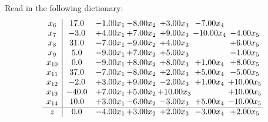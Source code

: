 \documentclass[9pt]{article}
\begin{document}
Read in the following dictionary:
\[\begin{array}{c| c c@{\hskip 2pt} c@{\hskip 2pt} c@{\hskip 2pt} c@{\hskip 2pt} c@{\hskip 2pt} }
 x_{6}   &  17.0 & -1.00 x_{1} & -8.00 x_{2} & +  3.00 x_{3} & -7.00 x_{4} &   \\
 x_{7}   &  -3.0 & +  4.00 x_{1} & +  7.00 x_{2} & +  9.00 x_{3} & -10.00 x_{4} & -4.00 x_{5}\\
 x_{8}   &  31.0 & -7.00 x_{1} & -9.00 x_{2} & +  4.00 x_{3} &   & +  6.00 x_{5}\\
 x_{9}   &  5.0 & -9.00 x_{1} & +  7.00 x_{2} & +  5.00 x_{3} &   & -1.00 x_{5}\\
 x_{10}   &  0.0 & -9.00 x_{1} & +  8.00 x_{2} & +  8.00 x_{3} & +  1.00 x_{4} & +  8.00 x_{5}\\
 x_{11}   &  37.0 & -7.00 x_{1} & -8.00 x_{2} & +  2.00 x_{3} & +  5.00 x_{4} & -5.00 x_{5}\\
 x_{12}   &  -2.0 & +  3.00 x_{1} & +  9.00 x_{2} & -2.00 x_{3} & +  1.00 x_{4} & + 10.00 x_{5}\\
 x_{13}   &  -40.0 & +  7.00 x_{1} & +  5.00 x_{2} & + 10.00 x_{3} &   & + 10.00 x_{5}\\
 x_{14}   &  10.0 & +  3.00 x_{1} & -6.00 x_{2} & -3.00 x_{3} & +  5.00 x_{4} & -10.00 x_{5}\\
\hline
z    &  0.0 & -4.00 x_{1} & +  3.00 x_{2} & +  2.00 x_{3} & -3.00 x_{4} & +  2.00 x_{5}\\
\end{array}\]
\end{document}
